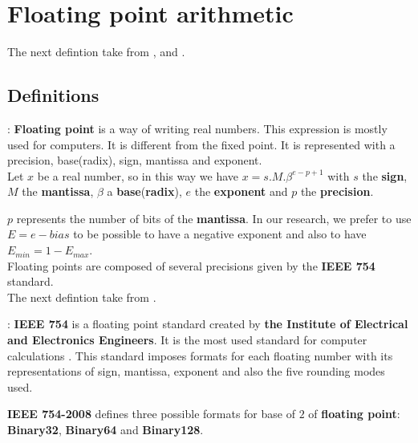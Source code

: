 \chapter{Floating point arithmetic}
The next defintion take from \cite{lefevre2004arithmetique}, \cite{markstein2008new} and \cite{muller2010handbook}.
\section{Definitions}
\begin{defin}:
\textbf{Floating point} is a way of writing real numbers. This expression is mostly used for computers. It is different from the fixed point. It is represented with a precision,  base(radix),  sign,  mantissa and exponent.\\ 
Let $x$ be a real number, so in this way we have $x = s.M.\beta^{e-p+1}$ with $s$ the \textbf{sign}, $M$ the \textbf{mantissa}, $\beta$ a \textbf{base}(\textbf{radix}), $e$ the \textbf{exponent} and $p$ the \textbf{precision}.
 \end{defin}
 $p$ represents the number of bits of the \textbf{mantissa}.
 In our research, we prefer to use $E = e - bias$ to be possible to have a negative exponent and also to have $E_{min}= 1 - E_{max}$.\\ 


Floating points are composed of several precisions given by the \textbf{IEEE 754} standard.\\

The next defintion take from \cite{enwiki:1096894205}.
\begin{defin} :
\textbf{IEEE 754} is a floating point standard created by \textbf{the Institute of Electrical and Electronics Engineers}. It is the  most used standard for computer calculations .
This standard imposes formats for each floating number with its representations of sign, mantissa, exponent and also the five rounding modes used.
\end{defin}

\textbf{IEEE 754-2008} defines three possible formats for base of $2$ of \textbf{floating point}: \textbf{Binary32}, \textbf{Binary64} and \textbf{Binary128}.

